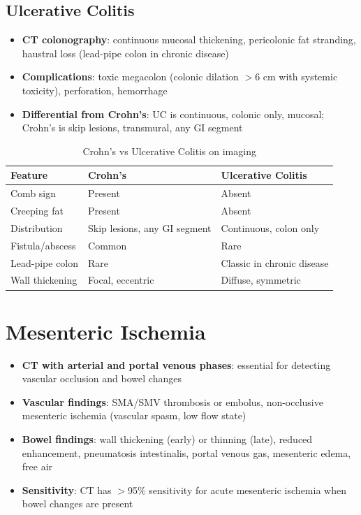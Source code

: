 \subsection{Ulcerative Colitis}
\begin{itemize}
  \item \textbf{CT colonography}: continuous mucosal thickening, pericolonic fat stranding, haustral loss (lead-pipe colon in chronic disease)
  \item \textbf{Complications}: toxic megacolon (colonic dilation $>$6 cm with systemic toxicity), perforation, hemorrhage
  \item \textbf{Differential from Crohn's}: UC is continuous, colonic only, mucosal; Crohn's is skip lesions, transmural, any GI segment
\end{itemize}

\begin{table}[h]
\centering
\caption{Crohn's vs Ulcerative Colitis on imaging}
\begin{tabular}{|l|l|l|}
\hline
\textbf{Feature} & \textbf{Crohn's} & \textbf{Ulcerative Colitis} \\
\hline
Comb sign & Present & Absent \\
Creeping fat & Present & Absent \\
Distribution & Skip lesions, any GI segment & Continuous, colon only \\
Fistula/abscess & Common & Rare \\
Lead-pipe colon & Rare & Classic in chronic disease \\
Wall thickening & Focal, eccentric & Diffuse, symmetric \\
\hline
\end{tabular}
\end{table}

\section{Mesenteric Ischemia}
\begin{itemize}
  \item \textbf{CT with arterial and portal venous phases}: essential for detecting vascular occlusion and bowel changes
  \item \textbf{Vascular findings}: SMA/SMV thrombosis or embolus, non-occlusive mesenteric ischemia (vascular spasm, low flow state)
  \item \textbf{Bowel findings}: wall thickening (early) or thinning (late), reduced enhancement, pneumatosis intestinalis, portal venous gas, mesenteric edema, free air
  \item \textbf{Sensitivity}: CT has $>$95\% sensitivity for acute mesenteric ischemia when bowel changes are present
\end{itemize}

